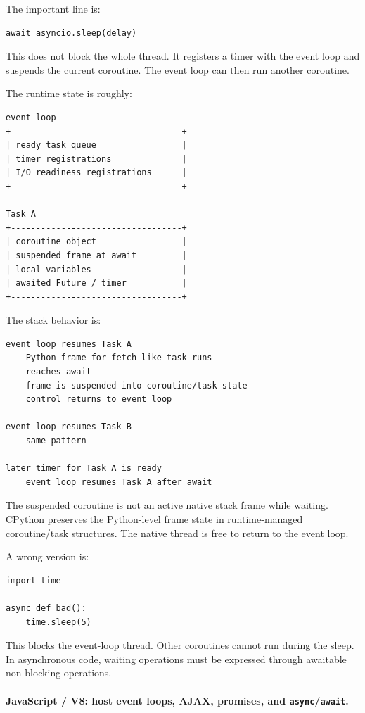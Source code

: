 The important line is:

\begin{verbatim}
await asyncio.sleep(delay)
\end{verbatim}

This does not block the whole thread. It registers a timer with the event loop and suspends the current coroutine. The event loop can then run another coroutine.

The runtime state is roughly:

\begin{verbatim}
event loop
+----------------------------------+
| ready task queue                 |
| timer registrations              |
| I/O readiness registrations      |
+----------------------------------+

Task A
+----------------------------------+
| coroutine object                 |
| suspended frame at await         |
| local variables                  |
| awaited Future / timer           |
+----------------------------------+
\end{verbatim}

The stack behavior is:

\begin{verbatim}
event loop resumes Task A
    Python frame for fetch_like_task runs
    reaches await
    frame is suspended into coroutine/task state
    control returns to event loop

event loop resumes Task B
    same pattern

later timer for Task A is ready
    event loop resumes Task A after await
\end{verbatim}

The suspended coroutine is not an active native stack frame while waiting. CPython preserves the Python-level frame state in runtime-managed coroutine/task structures. The native thread is free to return to the event loop.

A wrong version is:

\begin{verbatim}
import time

async def bad():
    time.sleep(5)
\end{verbatim}

This blocks the event-loop thread. Other coroutines cannot run during the sleep. In asynchronous code, waiting operations must be expressed through awaitable non-blocking operations.

\paragraph{JavaScript / V8: host event loops, AJAX, promises, and \texttt{async}/\texttt{await}.}


